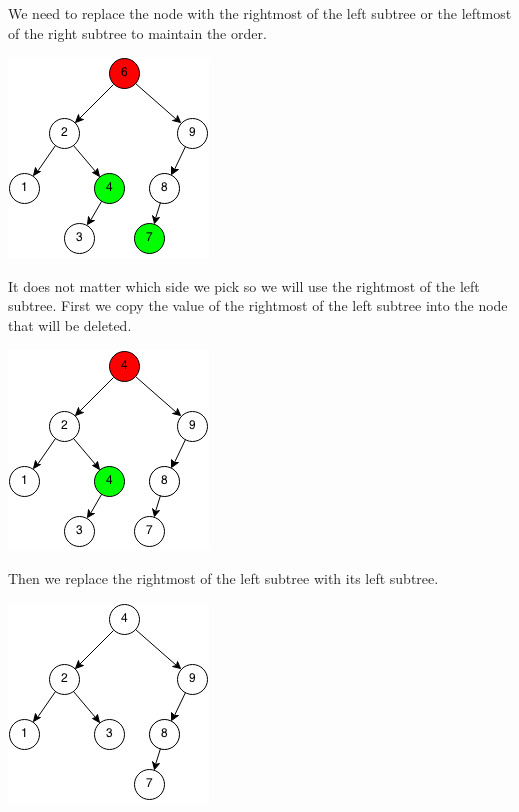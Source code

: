 \documentclass[11pt,oneside]{book}
\makeatletter
\def\maxwidth#1{\ifdim\Gin@nat@width>#1 #1\else\Gin@nat@width\fi}
\makeatother
\begin{document}
We need to replace the node with the rightmost of the left subtree or the leftmost of the right subtree to maintain the order.

\includegraphics[width=\maxwidth{\textwidth}]{bst-rem-case32.png}

It does not matter which side we pick so we will use the rightmost of the left subtree. First we copy the value of the rightmost of the left subtree into the node that will be deleted.

\includegraphics[width=\maxwidth{\textwidth}]{bst-rem-case33.png}

Then we replace the rightmost of the left subtree with its left subtree.

\includegraphics[width=\maxwidth{\textwidth}]{bst-rem-case34.png}
\end{document}
